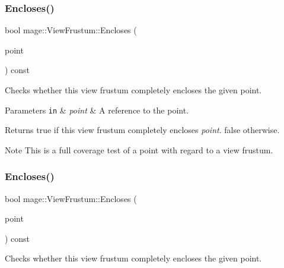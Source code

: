 \subsubsection{\texorpdfstring{Encloses()}{Encloses()}\hspace{0.1cm}{\footnotesize\ttfamily [1/4]}}
{\footnotesize\ttfamily bool mage\+::\+View\+Frustum\+::\+Encloses (\begin{DoxyParamCaption}\item[{const \hyperlink{structmage_1_1_point3}{Point3} \&}]{point }\end{DoxyParamCaption}) const\hspace{0.3cm}{\ttfamily [noexcept]}}

Checks whether this view frustum completely encloses the given point.


\begin{DoxyParams}[1]{Parameters}
\mbox{\tt in}  & {\em point} & A reference to the point. \\
\hline
\end{DoxyParams}
\begin{DoxyReturn}{Returns}
{\ttfamily true} if this view frustum completely encloses {\itshape point}. {\ttfamily false} otherwise. 
\end{DoxyReturn}
\begin{DoxyNote}{Note}
This is a full coverage test of a point with regard to a view frustum. 
\end{DoxyNote}
\hypertarget{structmage_1_1_view_frustum_aba92d74f79b16d7ae656b2f271202d12}{}\label{structmage_1_1_view_frustum_aba92d74f79b16d7ae656b2f271202d12} 
\subsubsection{\texorpdfstring{Encloses()}{Encloses()}\hspace{0.1cm}{\footnotesize\ttfamily [2/4]}}
{\footnotesize\ttfamily bool mage\+::\+View\+Frustum\+::\+Encloses (\begin{DoxyParamCaption}\item[{F\+X\+M\+V\+E\+C\+T\+OR}]{point }\end{DoxyParamCaption}) const\hspace{0.3cm}{\ttfamily [noexcept]}}

Checks whether this view frustum completely encloses the given point.


